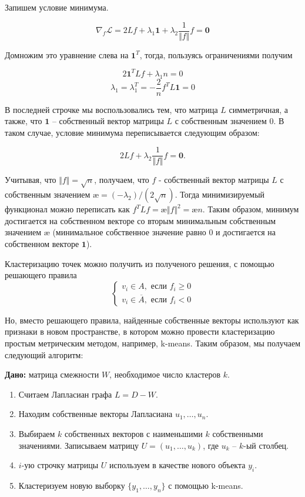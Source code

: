 \documentclass[12pt,a4paper]{article}
\begin{document}
Запишем условие минимума.

\begin{equation*}
	\nabla_f \mathcal{L} = 2Lf + \lambda_1 \mathbf{1} + \lambda_2 \frac{1}{\Vert f \Vert} f = \mathbf{0}
\end{equation*}

Домножим это уравнение слева на $\mathbf{1}^T$, тогда, пользуясь ограничениями получим

\begin{equation*}
	2\mathbf{1}^T Lf + \lambda_1 n = 0
\end{equation*}
\begin{equation*}
	\lambda_1 = \lambda_1^T = -\frac{2}{n} f^T L \mathbf{1} = 0
\end{equation*}

В последней строчке мы воспользовались тем, что матрица $L$ симметричная, а также, что $\mathbf{1}$ – собственный вектор матрицы $L$ с собственным значением $0$. В таком случае, условие минимума переписывается следующим образом:

\begin{equation*}
	2Lf + \lambda_2 \frac{1}{\Vert f \Vert} f = \mathbf{0}.
\end{equation*}

Учитывая, что $\Vert f \Vert = \sqrt{n}$, получаем, что $f$ - собственный вектор матрицы $L$ с собственным значением $æ = (-\lambda_2)/(2\sqrt{n})$. Тогда минимизируемый функционал можно переписать как $f^T L f = æ \Vert f \Vert^2 = æ n$. Таким образом, минимум достигается на собственном векторе со вторым минимальным собственным значением $æ$ (минимальное собственное значение равно $0$ и достигается на собственном векторе $\mathbf{1}$).

Кластеризацию точек можно получить из полученого решения, с помощью решающего правила
\begin{equation*}
	\begin{cases}
	v_i \in A, \text{ если } f_i \geq 0\\
	v_i \in \overline{A}, \text{ если } f_i < 0
	\end{cases}
\end{equation*}

Но, вместо решающего правила, найденные собственные векторы используют как признаки в новом пространстве, в котором можно провести кластеризацию простым метрическим методом, например, k-means. Таким образом, мы получаем следующий алгоритм:

\newpage
\textbf{Дано:} матрица смежности $W$, необходимое число кластеров $k$.
\begin{enumerate}
	\item Считаем Лапласиан графа $L = D - W$.
	\item Находим собственные векторы Лапласиана $u_1, \ldots, u_n$.
	\item Выбираем $k$ собственных векторов с наименьшими $k$ собственными значениями. Записываем матрицу $U = (u_1, \ldots, u_k)$, где $u_k$ – $k$-ый столбец.
	\item $i$-ую строчку матрицы $U$ используем в качестве нового объекта $y_i$.
	\item Кластеризуем новую выборку $\{y_1, \ldots, y_n\}$ с помощью k-means.
\end{enumerate}
\end{document}
